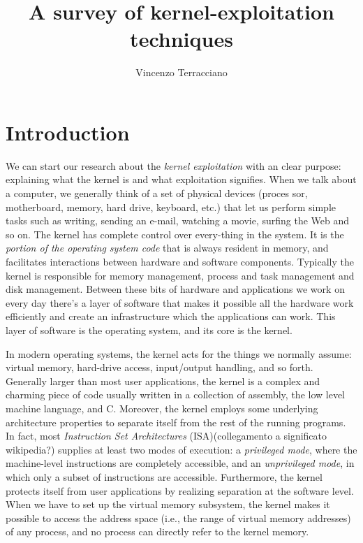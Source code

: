 \documentclass{masterthesis}
\newcommand{\vtnote}[1]{\todo[color=blue!20]{#1}}
\begin{document}
\title{A survey of kernel-exploitation techniques}

\author{Vincenzo Terracciano}


\examiner{_______ ______}

\maketitle

\tableofcontents

\chapter{Introduction}

We can start our research about the \emph{kernel exploitation} with an clear purpose: explaining what the kernel is and what exploitation signifies.
\vtnote{ciao}
When we talk about a computer, we generally think of a set of physical devices (proces sor, motherboard, memory, hard drive, keyboard, etc.) that let us  perform simple tasks such as writing, sending an e-mail, watching a movie, surfing the Web and so on. 
The kernel has complete control over every-thing in the system. It is the \emph{portion of the operating system code} that is always resident in memory, and facilitates interactions between hardware and software components.
Typically the kernel is responsible for memory management, process and task management and disk management.
Between these bits of hardware and applications we work on every day there's a layer of software that makes it possible all the hardware work efficiently and create an infrastructure which the applications can work.
This layer of software is the operating system, and its core is the kernel.

In modern operating systems, the kernel acts for the things we normally assume: virtual memory, hard-drive access, input/output handling, and so forth. Generally larger than most user applications, the kernel is a complex and charming piece of code usually written in a collection of assembly, the low level machine language, and C. 
Moreover, the kernel employs some underlying architecture properties to separate itself from the rest of the running programs.
In fact, most \emph{Instruction Set Architectures} (ISA)(collegamento a significato wikipedia?) supplies at least two modes of execution: a \emph{privileged mode}, where the machine-level instructions are completely accessible, and an \emph{unprivileged mode}, in which only a subset of instructions are accessible. 
Furthermore, the kernel protects itself from user applications by realizing separation at the software level.
When we have to set up the virtual memory subsystem, the kernel makes it possible to access the address space (i.e., the range of virtual memory addresses) of any process, and no process can directly refer to the kernel memory.
\end{document}
